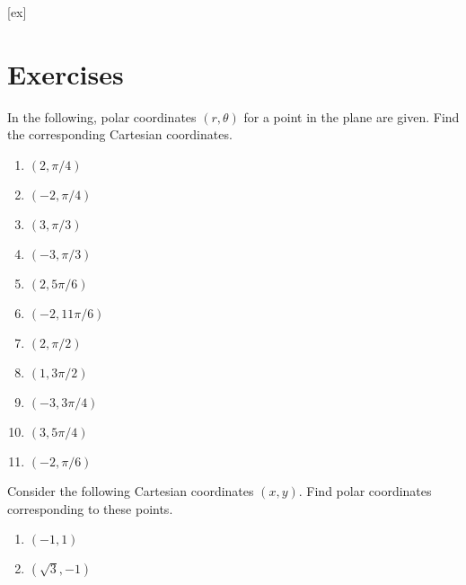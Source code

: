 [ex]
\section*{Exercises}

\begin{enumialphparenastyle}

\begin{ex} In the following, polar coordinates $\left( r,\theta \right) $ for a
point in the plane are given. Find the corresponding Cartesian coordinates. 

\begin{enumerate}
\item $\left( 2,\pi /4\right) $

\item $\left( -2,\pi /4\right) $

\item $\left( 3,\pi /3\right) $

\item $\left( -3,\pi /3\right) $

\item $\left( 2,5\pi /6\right) $

\item $\left( -2,11\pi /6\right) $

\item $\left( 2,\pi /2\right) $

\item $\left( 1,3\pi /2\right) $

\item $\left( -3,3\pi /4\right) $

\item $\left( 3,5\pi /4\right) $

\item $\left( -2,\pi /6\right) $
\end{enumerate}
\end{ex}

\begin{ex} Consider the following Cartesian coordinates $\left( x,y\right)$. Find polar coordinates corresponding to these points. 

\begin{enumerate}
\item $\left( -1,1\right) $

\item $\left( \sqrt{3},-1\right) $


\end{enumerate}
\end{ex}
\end{enumialphparenastyle}
